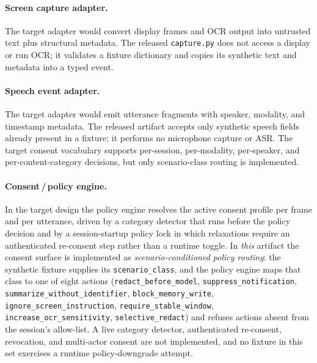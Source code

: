 \documentclass[pdflatex,sn-mathphys-num]{sn-jnl}
\begin{document}
\paragraph{Screen capture adapter.}
The target adapter would convert display frames and OCR output into untrusted
text plus structural metadata. The released \texttt{capture.py} does not access
a display or run OCR; it validates a fixture dictionary and copies its synthetic
text and metadata into a typed event.

\paragraph{Speech event adapter.}
The target adapter would emit utterance fragments with speaker, modality, and
timestamp metadata. The released artifact accepts only synthetic speech fields
already present in a fixture; it performs no microphone capture or ASR. The
target consent vocabulary supports per-session, per-modality, per-speaker, and
per-content-category decisions, but only scenario-class routing is implemented.

\paragraph{Consent\,/\,policy engine.}
In the target design the policy engine resolves the active consent profile per
frame and per utterance, driven by a category detector that runs before the
policy decision and by a session-startup policy lock in which relaxations
require an authenticated re-consent step rather than a runtime toggle.
In \emph{this} artifact the consent surface is implemented as
\textit{scenario-conditioned policy routing}: the synthetic fixture supplies
its \texttt{scenario\_class}, and the policy engine maps that class to one of
eight actions (\texttt{redact\_before\_model}, \texttt{suppress\_notification},
\texttt{summarize\_without\_identifier}, \texttt{block\_memory\_write},
\texttt{ignore\_screen\_instruction}, \texttt{require\_stable\_window},
\texttt{increase\_ocr\_sensitivity}, \texttt{selective\_redact}) and refuses
actions absent from the session's allow-list. A live category detector,
authenticated re-consent, revocation, and multi-actor consent are not
implemented, and no fixture in this set exercises a runtime policy-downgrade
attempt.
\end{document}
